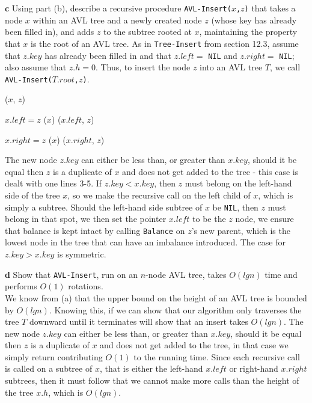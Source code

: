\documentclass[11pt,english]{article}
\begin{document}
\newpage
\noindent \large{\textbf{c} \mdseries Using part (b), describe a recursive
procedure \texttt{AVL-Insert($x$,$z$)} that takes a node $x$ within an AVL
tree and a newly created node $z$ (whose key has already been filled in), and
adds $z$ to the subtree rooted at $x$, maintaining the property that $x$ is
the root of an AVL tree. As in \texttt{Tree-Insert} from section 12.3, assume
that $z.key$ has already been filled in and that $z.left =$ \texttt{NIL} and
$z.right =$ \texttt{NIL}; also assume that $z.h = 0$. Thus, to insert the node
$z$ into an AVL tree $T$, we call \texttt{AVL-Insert($T.root$,$z$)}.}
\begin{algorithm}
	\BlankLine
	
	\AVLInsert($x$, $z$) \\
	\Begin
	{
		
		
		{
			{
				$x.left = z$
				\Balance($x$)
			}
			{
				\AVLInsert($x.left$, $z$)
			}
		}
		
		{
			{
				$x.right = z$
				\Balance($x$)
			}
			{
				\AVLInsert($x.right$, $z$)
			}
		}
	}
\end{algorithm}
The new node $z.key$ can either be less than, or greater than $x.key$, should
it be equal then $z$ is a duplicate of $x$ and does not get added to the tree
- this case is dealt with one lines 3-5. If $z.key < x.key$, then $z$ must
belong on the left-hand side of the tree $x$, so we make the recursive call on
the left child of $x$, which is simply a subtree. Should the left-hand side
subtree of $x$ be \texttt{NIL}, then $z$ must belong in that spot, we then
set the pointer $x.left$ to be the $z$ node, we ensure that balance is kept
intact by calling \texttt{Balance} on $z$'s new parent, which is the lowest
node in the tree that can have an imbalance introduced. The case for $z.key >
x.key$ is symmetric.

\newpage
\noindent \large{\textbf{d} \mdseries Show that \texttt{AVL-Insert}, run on an
$n$-node AVL tree, takes $O(lg n)$ time and performs $O(1)$ rotations.}
\\
We know from (a) that the upper bound on the height of an AVL tree is bounded
by $O(lg n)$. Knowing this, if we can show that our algorithm only traverses
the tree $T$ downward until it terminates will show that an insert takes
$O(lg n)$. The new node $z.key$ can either be less than, or greater than
$x.key$, should it be equal then $z$ is a duplicate of $x$ and does not get
added to the tree, in that case we simply return contributing $O(1)$ to the
running time. Since each recursive call is called on a subtree of $x$, that is
either the left-hand $x.left$ or right-hand $x.right$ subtrees, then it must
follow that we cannot make more calls than the height of the tree $x.h$, which
is $O(lg n)$.
\end{document}
